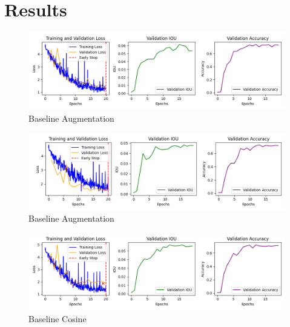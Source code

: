 \section*{Results}

\begin{figure}[H]
	\centering
	\includegraphics[width=\textwidth]{plots/baseline}
	\caption{Baseline Augmentation}
	\label{fig:baseline}
\end{figure}

\begin{figure}[H]
	\centering
	\includegraphics[width=\textwidth]{plots/baseline_augmentation}
	\caption{Baseline Augmentation}
	\label{fig:baseline_aug}
\end{figure}

\begin{figure}[H]
	\centering
	\includegraphics[width=\textwidth]{plots/baseline_cosine}
	\caption{Baseline Cosine}
	\label{fig:baseline_cos}
\end{figure}

